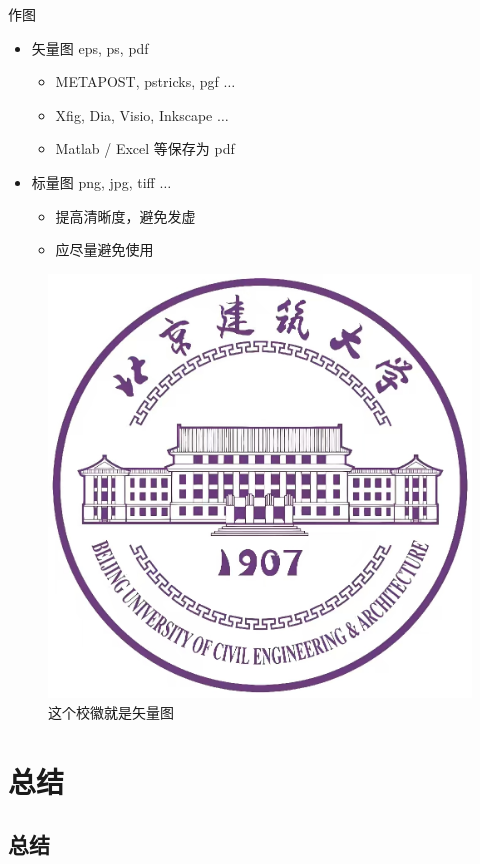 \documentclass{beamer}
\begin{document}
\begin{frame}{作图}
    \begin{itemize}
        \item 矢量图 eps, ps, pdf
        \begin{itemize}
            \item METAPOST, pstricks, pgf $\ldots$
            \item Xfig, Dia, Visio, Inkscape $\ldots$
            \item Matlab / Excel 等保存为 pdf
        \end{itemize}
        \item 标量图 png, jpg, tiff $\ldots$
        \begin{itemize}
            \item 提高清晰度，避免发虚
            \item 应尽量避免使用
        \end{itemize}
    \end{itemize}
    \begin{figure}[htpb]
        \centering
        \includegraphics[width=0.2\linewidth]{pic/bucea_logo.png}
        \caption{这个校徽就是矢量图}
    \end{figure}
\end{frame}

\section{总结}

\subsection{总结}
\end{document}

